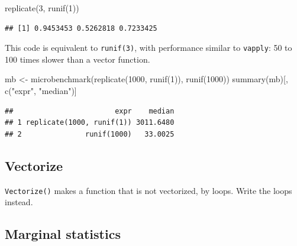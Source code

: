 \documentclass[
  12pt,
  american,
  a4paper,
  extrafontsizes,onecolumn,openright
  ]{memoir}
\newenvironment{Shaded}{\begin{snugshade}}{\end{snugshade}}
\newcommand{\DecValTok}[1]{\textcolor[rgb]{0.00,0.00,0.81}{#1}}
\newcommand{\FunctionTok}[1]{\textcolor[rgb]{0.00,0.00,0.00}{#1}}
\newcommand{\NormalTok}[1]{#1}
\newcommand{\OtherTok}[1]{\textcolor[rgb]{0.56,0.35,0.01}{#1}}
\newcommand{\StringTok}[1]{\textcolor[rgb]{0.31,0.60,0.02}{#1}}
\newlength{\rf}
\begin{document}
\scriptsize

\begin{Shaded}
\begin{Highlighting}[]
\FunctionTok{replicate}\NormalTok{(}\DecValTok{3}\NormalTok{, }\FunctionTok{runif}\NormalTok{(}\DecValTok{1}\NormalTok{))}
\end{Highlighting}
\end{Shaded}

\begin{verbatim}
## [1] 0.9453453 0.5262818 0.7233425
\end{verbatim}

\normalsize

This code is equivalent to \texttt{runif(3)}, with performance similar to \texttt{vapply}: 50 to 100 times slower than a vector function.

\scriptsize

\begin{Shaded}
\begin{Highlighting}[]
\NormalTok{mb }\OtherTok{\textless{}{-}} \FunctionTok{microbenchmark}\NormalTok{(}\FunctionTok{replicate}\NormalTok{(}\DecValTok{1000}\NormalTok{, }\FunctionTok{runif}\NormalTok{(}\DecValTok{1}\NormalTok{)), }\FunctionTok{runif}\NormalTok{(}\DecValTok{1000}\NormalTok{))}
\FunctionTok{summary}\NormalTok{(mb)[, }\FunctionTok{c}\NormalTok{(}\StringTok{"expr"}\NormalTok{, }\StringTok{"median"}\NormalTok{)]}
\end{Highlighting}
\end{Shaded}

\begin{verbatim}
##                        expr    median
## 1 replicate(1000, runif(1)) 3011.6480
## 2               runif(1000)   33.0025
\end{verbatim}

\normalsize

\hypertarget{vectorize}{%
\subsection{Vectorize}\label{vectorize}}

\texttt{Vectorize()} makes a function that is not vectorized, by loops.
Write the loops instead.

\hypertarget{marginal-statistics}{%
\subsection{Marginal statistics}\label{marginal-statistics}}
\end{document}
